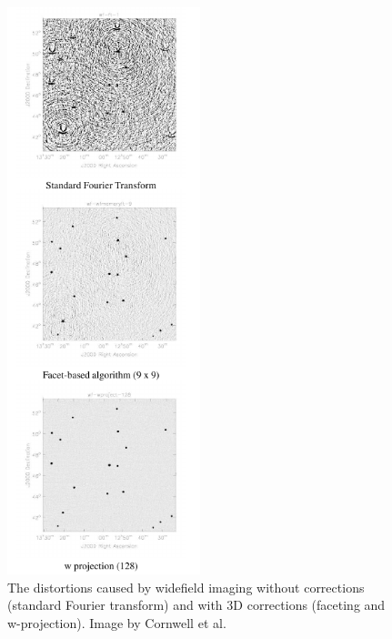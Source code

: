 \documentclass[a4paper, two column]{article}
\begin{document}
\begin{figure}[h]
 \begin{mdframed}
 \centering
 \includegraphics[width=0.5\textwidth]{3d_correction.png}
 \caption{The distortions caused by widefield imaging without corrections (standard Fourier transform) and with 3D corrections (faceting and w-projection). Image by Cornwell et al. \cite{1416440}}
  \label{FIG_3D_DISTORTIONS}
 \end{mdframed}
\end{figure}
\end{document}
